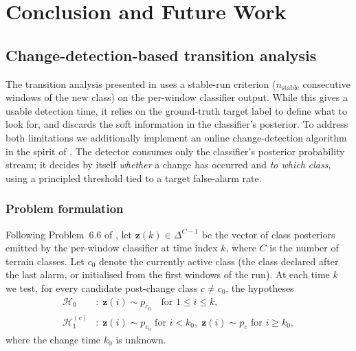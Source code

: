 \chapter{Conclusion and Future Work}
\label{ch:conclusion}








\section{Change-detection-based transition analysis}
\label{sec:transition_cusum}

The transition analysis presented in  uses a
stable-run criterion ($n_{\text{stable}}$ consecutive windows of the new class)
on the per-window classifier output. While this gives a usable detection time,
it relies on the ground-truth target label to define what to look for, and
discards the soft information in the classifier's posterior. To address both
limitations we additionally implement an online change-detection algorithm in
the spirit of \cite[\S6.4]{Blanke2003}. The detector consumes only the
classifier's posterior probability stream; it decides by itself \emph{whether}
a change has occurred and \emph{to which class}, using a principled threshold
tied to a target false-alarm rate.

\subsection{Problem formulation}
\label{sec:cusum_problem}

Following Problem~6.6 of \cite{Blanke2003}, let
$\mathbf{z}(k)\in\Delta^{C-1}$ be the vector of class posteriors emitted by the
per-window classifier at time index $k$, where $C$ is the number of terrain
classes. Let $c_0$ denote the currently active class (the class declared after
the last alarm, or initialised from the first windows of the run). At each
time $k$ we test, for every candidate post-change class $c\neq c_0$, the
hypotheses
\begin{align}
  \mathcal{H}_0 &:\; \mathbf{z}(i)\sim p_{c_0} \quad \text{for } 1\le i\le k, \\
  \mathcal{H}_1^{(c)} &:\;
    \mathbf{z}(i)\sim p_{c_0} \text{ for } i<k_0,\;
    \mathbf{z}(i)\sim p_{c}   \text{ for } i\ge k_0,
\end{align}
where the change time $k_0$ is unknown.

